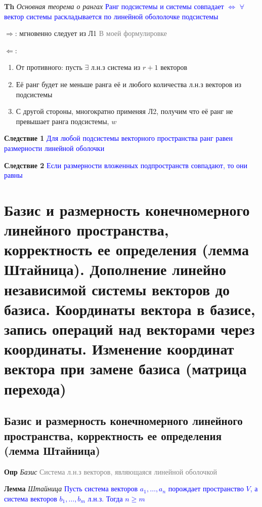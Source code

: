 \documentclass[a4paper, 14pt]{article}
\begin{document}
    \textbf{Th} \textit{Основная теорема о рангах}
    \textcolor{blue}{Ранг подсистемы и системы совпадает $\Leftrightarrow$ $\forall$ вектор системы
    раскладывается по линейной обололочке подсистемы}

    $\Rightarrow$: мгновенно следует из Л1 \textcolor{gray}{В моей формулировке}

    $\Leftarrow$:
    \begin{enumerate}
        \item От противного: пусть $\exists$ л.н.з система из $r+1$ векторов
        \item Её ранг будет не меньше ранга её и любого количества л.н.з векторов из подсистемы
        \item С другой стороны, многократно применяя Л2, получим что её ранг не превышает ранга подсистемы, $w$
    \end{enumerate}

    \textbf{Следствие 1}
    \textcolor{blue}{Для любой подсистемы векторного пространства ранг равен размерности линейной оболочки}

    \textbf{Следствие 2}
    \textcolor{blue}{Если размерности вложенных подпространств совпадают, то они равны}

    \section{Базис и размерность конечномерного линейного пространства, корректность ее определения
        (лемма Штайница).
        Дополнение линейно независимой системы векторов до базиса.
        Координаты вектора в базисе, запись операций над векторами через координаты.
        Изменение координат вектора при замене базиса (матрица перехода)}

    \subsection{Базис и размерность конечномерного линейного пространства, корректность ее определения (лемма Штайница)}

    \textbf{Опр} \textit{Базис} \textcolor{gray}{Система л.н.з векторов, являющаяся линейной оболочкой}

    \textbf{Лемма} \textit{Штайница}
    \textcolor{blue}{Пусть система векторов $a_1, \dots, a_n$ порождает пространство $V$, а система
    векторов $b_1, \dots, b_m$ л.н.з. Тогда $n \geq m$}
\end{document}

